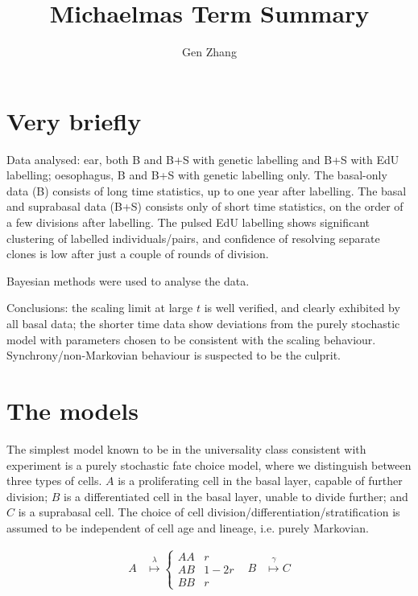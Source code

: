 \documentclass[10pt,english]{article}
\begin{document}
\title{Michaelmas Term Summary}
\author{Gen Zhang}

\maketitle

\section{Very briefly}

Data analysed: ear, both B and B+S with genetic labelling and B+S with EdU labelling; oesophagus, B and B+S with genetic labelling only. The basal-only data (B) consists of long time statistics, up to one year after labelling. The basal and suprabasal data (B+S) consists only of short time statistics, on the order of a few divisions after labelling.
The pulsed EdU labelling shows significant clustering of labelled individuals/pairs, and confidence of resolving separate clones is low after just a couple of rounds of division.

Bayesian methods were used to analyse the data.

Conclusions: the scaling limit at large $t$ is well verified, and clearly exhibited by all basal data; the shorter time data show deviations from the purely stochastic model with parameters chosen to be consistent with the scaling behaviour. Synchrony/non-Markovian behaviour is suspected to be the culprit.

\section{The models}

The simplest model known to be in the universality class consistent with experiment is a purely stochastic fate choice model, where we distinguish between three types of cells. $A$ is a proliferating cell in the basal layer, capable of further division; $B$ is a differentiated cell in the basal layer, unable to divide further; and $C$ is a suprabasal cell. The choice of cell division/differentiation/stratification is assumed to be independent of cell age and lineage, i.e. purely Markovian.

\begin{align*}
A &\overset{\lambda}{\longmapsto} \begin{cases}
AA & r \\
AB & 1-2r \\
BB & r\end{cases} & B &\overset{\gamma}{\longmapsto} C
\end{align*}
\end{document}
